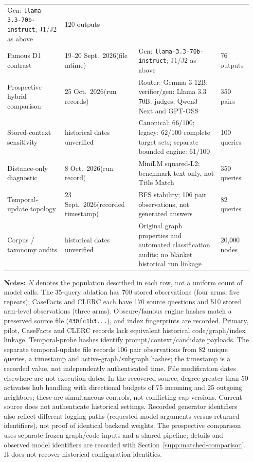 \begin{longtable}{@{}p{3.8cm}p{2.2cm}p{5.2cm}p{1.4cm}@{}}
      Gen: \texttt{llama-3.3-70b-instruct}; J1/J2 as above &
      120 outputs \\
    \addlinespace
    Famous D1 contrast & 19--20 Sept.\ 2026\newline (file mtime) &
      Gen: \texttt{llama-3.3-70b-instruct}; J1/J2 as above &
      76 outputs \\
    \addlinespace
    Prospective hybrid comparison & 25 Oct.\ 2026\newline (run records) &
      Router: Gemma 3 12B; verifier/gen: Llama 3.3 70B; judges: Qwen3-Next and GPT-OSS & 350 pairs \\
    \addlinespace
    Stored-context sensitivity & historical dates unverified &
      Canonical: 66/100; legacy: 62/100 complete target sets; separate bounded engine: 61/100 & 100 queries \\
    \addlinespace
    Distance-only diagnostic & 8 Oct.\ 2026\newline (run record) &
      MiniLM squared-L2; benchmark text only, not Title Match & 350 queries \\
    \addlinespace
    Temporal-update topology & 23 Sept.\ 2026\newline (recorded timestamp) &
      BFS stability; 106 pair observations, not generated answers & 82 queries \\
    \addlinespace
    Corpus / taxonomy audits & historical dates unverified &
      Original graph properties and automated classification audits; no blanket historical run linkage & 20,000 nodes \\
    \bottomrule
  \end{longtable}
\footnotesize\raggedright\textbf{Notes:} $N$ denotes the population described in each row, not a uniform count of model calls. The 35-query ablation has 700 stored observations (four arms, five repeats); CaseFacts and CLERC each have 170 source questions and 510 stored arm-level observations (three arms). Obscure/famous engine hashes match a preserved source file (\texttt{430fc1b3...}), and index fingerprints are recorded. Primary, pilot, CaseFacts and CLERC records lack equivalent historical code/graph/index linkage. Temporal-probe hashes identify prompt/context/candidate payloads. The separate temporal-update file records 106 pair observations from 82 unique queries, a timestamp and active-graph/subgraph hashes; the timestamp is a recorded value, not independently authenticated time. File modification dates elsewhere are not execution dates. In the recovered source, degree greater than 50 activates hub handling with directional budgets of 75 incoming and 25 outgoing neighbors; these are simultaneous controls, not conflicting cap versions. Current source does not authenticate historical settings. Recorded generator identifiers also reflect different logging paths (requested model arguments versus returned identifiers), not proof of identical backend weights. The prospective comparison uses separate frozen graph/code inputs and a shared pipeline; details and observed model identifiers are recorded with Section~\ref{supp:matched-comparison}. It does not recover historical configuration identities.
\par\endgroup
